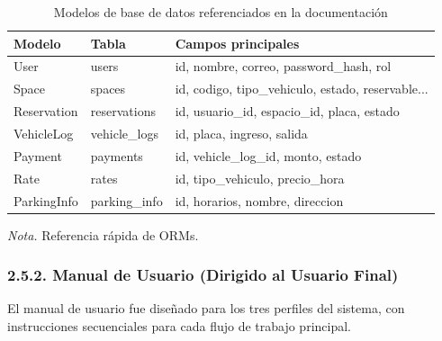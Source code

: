 \begin{table}[htbp]
\caption{Modelos de base de datos referenciados en la documentación}
\label{tab:modelos_bd}
\begin{tabular}{@{}p{3cm} p{3cm} p{9cm}@{}}
\toprule
\textbf{Modelo} & \textbf{Tabla} & \textbf{Campos principales} \\
\midrule
User & users & id, nombre, correo, password\_hash, rol \\
Space & spaces & id, codigo, tipo\_vehiculo, estado, reservable... \\
Reservation & reservations & id, usuario\_id, espacio\_id, placa, estado \\
VehicleLog & vehicle\_logs & id, placa, ingreso, salida \\
Payment & payments & id, vehicle\_log\_id, monto, estado \\
Rate & rates & id, tipo\_vehiculo, precio\_hora \\
ParkingInfo & parking\_info & id, horarios, nombre, direccion \\
\bottomrule
\end{tabular}
\par\vspace{0.2cm}
\textit{Nota.} Referencia rápida de ORMs.
\end{table}

\clearpage\subsubsection{2.5.2. Manual de Usuario (Dirigido al Usuario Final)}

El manual de usuario fue diseñado para los tres perfiles del sistema, con instrucciones secuenciales para cada flujo de trabajo principal.

